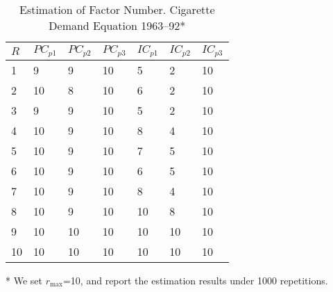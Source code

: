 \documentclass[a4paper]{article}
\begin{document}
\begin{table}[]
\centering
\caption{Estimation of Factor Number. Cigarette Demand Equation 1963–92*}
\label{table:table11}

    \begin{threeparttable}
        \begin{tabular}{lllllll}
\hline
 $R$ & $PC_{p1}$ & $PC_{p2}$ & $PC_{p3}$ & $IC_{p1}$ & $IC_{p2}$ & $IC_{p3}$ \\ \hline
1  & 9         & 9         & 10        & 5         & 2         & 10        \\
2  & 10        & 8         & 10        & 6         & 2         & 10        \\
3  & 9         & 9         & 10        & 5         & 2         & 10        \\
4  & 10        & 9         & 10        & 8         & 4         & 10        \\
5  & 10        & 9         & 10        & 7         & 5         & 10        \\
6  & 10        & 9         & 10        & 6         & 5         & 10        \\
7  & 10        & 9         & 10        & 8         & 4         & 10        \\
8  & 10        & 9         & 10        & 10        & 8         & 10        \\
9  & 10        & 10        & 10        & 10        & 10        & 10        \\
10 & 10        & 10        & 10        & 10        & 10        & 10        \\ \hline
        \end{tabular}

        \begin{tablenotes}
        \footnotesize
        \item[*] We set $r_{\text{max}}$=10, and report the estimation results under 1000 repetitions.
      \end{tablenotes}
    \end{threeparttable}

\end{table}
\end{document}
